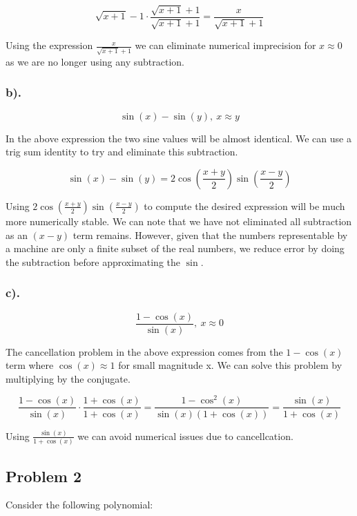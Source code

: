 \documentclass[11pt]{article}
\begin{document}
\[
\sqrt{x+1}-1\cdot\frac{\sqrt{x+1}+1}{\sqrt{x+1}+1} = \frac{x}{\sqrt{x+1}+1}
\]

Using the expression \(\boxed{\frac{x}{\sqrt{x+1}+1}}\) we can eliminate
numerical imprecision for \(x\approx0\) as we are no longer using any
subtraction.

    \hypertarget{b.}{%
\subsubsection*{b).}\label{b.}}

\[ \sin(x)-\sin(y),\: x\approx y \]

    In the above expression the two sine values will be almost identical. We
can use a trig sum identity to try and eliminate this subtraction.

\[
\sin(x) - \sin(y) = 2\cos(\frac{x+y}{2})\sin(\frac{x-y}{2})
\]

Using \(\boxed{2\cos(\frac{x+y}{2})\sin(\frac{x-y}{2})}\) to compute the
desired expression will be much more numerically stable. We can note
that we have not eliminated all subtraction as an \((x-y)\) term
remains. However, given that the numbers representable by a machine are
only a finite subset of the real numbers, we reduce error by doing the
subtraction before approximating the \(\sin\).

    \hypertarget{c.}{%
\subsubsection*{c).}\label{c.}}

\[ \frac{1-\cos(x)}{\sin(x)},\: x\approx 0 \]

    The cancellation problem in the above expression comes from the
\(1-\cos(x)\) term where \(\cos(x)\approx1\) for small magnitude x. We
can solve this problem by multiplying by the conjugate.

\[
\frac{1-\cos(x)}{\sin(x)}\cdot\frac{1+\cos(x)}{1+\cos(x)}=\frac{1-\cos^2(x)}{\sin(x)(1+\cos(x))} = \frac{\sin(x)}{1+\cos(x)}
\]

Using \(\boxed{\frac{\sin(x)}{1+\cos(x)}}\) we can avoid numerical
issues due to cancellcation.

    \hypertarget{problem-2}{%
\subsection*{Problem 2}\label{problem-2}}

Consider the following polynomial:
\end{document}
